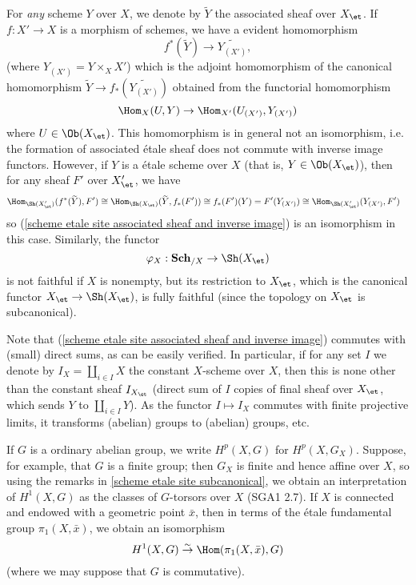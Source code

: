 \begin{remark}
For \textit{any} scheme $Y$ over $X$, we denote by $\widetilde{Y}$ the associated sheaf over $X_\et$. If $f:X'\to X$ is a morphism of schemes, we have a evident homomorphism
\begin{equation}\label{scheme etale site associated sheaf and inverse image}
f^*(\widetilde{Y})\to\widetilde{Y_{(X')}},
\end{equation}
(where $Y_{(X')}=Y\times_XX'$) which is the adjoint homomorphism of the canonical homomorphism $\widetilde{Y}\to f_*(\widetilde{Y_{(X')}})$ obtained from the functorial homomorphism
\[\Hom_X(U,Y)\to\Hom_{X'}(U_{(X')},Y_{(X')})\]
where $U\in\Ob(X_\et)$. This homomorphism is in general not an isomorphism, i.e. the formation of associated \'etale sheaf does not commute with inverse image functors. However, if $Y$ is a \'etale scheme over $X$ (that is, $Y\in\Ob(X_\et)$), then for any sheaf $F'$ over $X'_\et$, we have
\begin{align*}
\Hom_{\Sh(X'_\et)}(f^*(\widetilde{Y}),F')&\cong\Hom_{\Sh(X_\et)}(\widetilde{Y},f_*(F'))\cong f_*(F')(Y)=F'(Y_{(X')})\cong\Hom_{\Sh(X'_\et)}(Y_{(X')},F')
\end{align*}
so (\ref{scheme etale site associated sheaf and inverse image}) is an isomorphism in this case. Similarly, the functor
\[\varphi_X:\mathbf{Sch}_{/X}\to\Sh(X_\et)\]
is not faithful if $X$ is nonempty, but its restriction to $X_\et$, which is the canonical functor $X_\et\to\Sh(X_\et)$, is fully faithful (since the topology on $X_\et$ is subcanonical).\par
Note that (\ref{scheme etale site associated sheaf and inverse image}) commutes with (small) direct sums, as can be easily verified. In particular, if for any set $I$ we denote by $I_X=\coprod_{i\in I}X$ the constant $X$-scheme over $X$, then this is none other than the constant sheaf $I_{X_\et}$ (direct sum of $I$ copies of final sheaf over $X_\et$, which sends $Y$ to $\coprod_{i\in I}Y$). As the functor $I\mapsto I_X$ commutes with finite projective limits, it transforms (abelian) groups to (abelian) groups, etc.\par
If $G$ is a ordinary abelian group, we write $H^p(X,G)$ for $H^p(X,G_X)$. Suppose, for example, that $G$ is a finite group; then $G_X$ is finite and hence affine over $X$, so using the remarks in \cref{scheme etale site subcanonical}, we obtain an interpretation of $H^1(X,G)$ as the classes of $G$-torsors over $X$ (SGA1  2.7). If $X$ is connected and endowed with a geometric point $\bar{x}$, then in terms of the \'etale fundamental group $\pi_1(X,\bar{x})$, we obtain an isomorphism
\begin{equation}\label{scheme etale site cohomology G coefficient is pi_1 Hom}
H^1(X,G)\stackrel{\sim}{\to}\Hom(\pi_1(X,\bar{x}),G)
\end{equation}
(where we may suppose that $G$ is commutative).
\end{remark}


